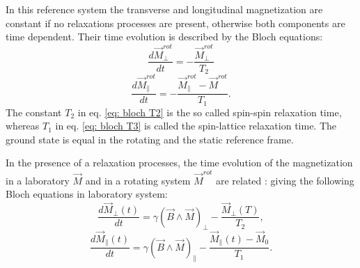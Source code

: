 In this reference system the transverse and longitudinal magnetization are constant if no relaxations processes are present, otherwise both components are time dependent. Their time evolution is described by the Bloch equations:
\begin{equation}
\label{eq: bloch T2}
\frac{d\vec{M}_\perp^{rot}}{dt} = -\frac{\vec{M}_\perp^{rot}}{T_2}
\end{equation}
\begin{equation}
\label{eq: bloch T3}
\frac{d\vec{M}_\parallel^{rot}}{dt} = -\frac{\vec{M}_\parallel^{rot} - \vec{M}^{rot}}{T_1}.
\end{equation}
The constant $T_2$ in eq. \ref{eq: bloch T2} is the so called spin-spin relaxation time, whereas $T_1$ in eq. \ref{eq: bloch T3} is called the spin-lattice relaxation time. The ground state is equal in the rotating and the static reference frame. 

In the presence of a relaxation processes, the time evolution of the magnetization in a laboratory $\vec{M}$ and in a rotating system $\vec{M}^{rot}$ are related :
 giving the following Bloch equations in laboratory system:
 \begin{equation}
 \label{bloch + rot T2}
   \frac{d \vec{M}_{\perp}(t)}{dt} = \gamma(\vec{B}\wedge\vec{M})_\perp - \frac{\vec{M}_\perp (T)}{T_2},
  \end{equation} 
  \begin{equation}
  \label{bloch + rot T1}
     \frac{d \vec{M}_{\parallel}(t)}{dt} = \gamma(\vec{B}\wedge\vec{M})_\parallel  -\frac{\vec{M}_\parallel (t)-\vec{M}_0}{T_1}.
  \end{equation}

